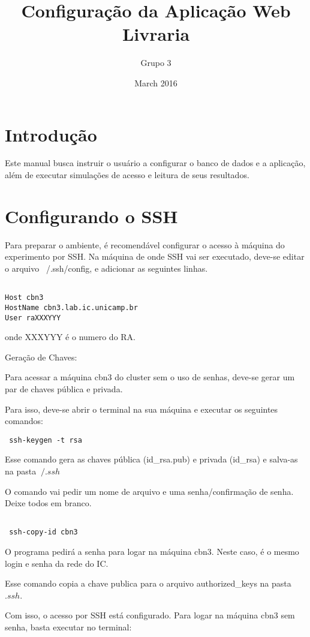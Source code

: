 \documentclass{article}
\title{Configuração da Aplicação Web Livraria}
\author{Grupo 3}
\date{March 2016}
\begin{document}
\maketitle

\section{Introdução}
Este manual busca instruir o usuário a configurar o banco de dados e a aplicação, além de executar simulações de acesso e leitura de seus resultados.

\section{Configurando o SSH}

Para preparar o ambiente, é recomendável configurar o acesso à máquina do experimento por SSH.
Na máquina de onde SSH vai ser executado, deve-se editar o arquivo ~/.ssh/config, e adicionar as seguintes linhas.
\begin{verbatim}
  
Host cbn3
HostName cbn3.lab.ic.unicamp.br
User raXXXYYY

\end{verbatim}

onde XXXYYY é o numero do RA.

Geração de Chaves:

Para acessar a máquina cbn3 do cluster sem o uso de senhas, deve-se gerar um par de chaves pública e privada.

Para isso, deve-se abrir o terminal na sua máquina e executar os seguintes comandos:
\begin{verbatim}
 ssh-keygen -t rsa
\end{verbatim}

Esse comando gera as chaves pública (id_rsa.pub) e privada (id_rsa) e salva-as na pasta $ ~/.ssh$

O comando vai pedir um nome de arquivo e uma senha/confirmação de senha. Deixe todos em branco.
\begin{verbatim}

 ssh-copy-id cbn3
\end{verbatim}

O programa pedirá a senha para logar na máquina cbn3. Neste caso, é o mesmo login e senha da rede do IC.

Esse comando copia a chave publica para o arquivo authorized_keys na pasta $.ssh$.

Com isso, o acesso por SSH está configurado. Para logar na máquina cbn3 sem senha, basta executar no terminal:
\end{document}
